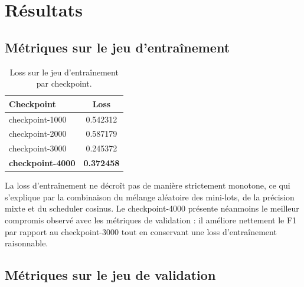 ﻿\documentclass[12pt, a4paper]{report}
\begin{document}
\section{Résultats}

\subsection{Métriques sur le jeu d'entraînement}

\begin{table}[H]
\centering
\renewcommand{\arraystretch}{1.4}
\begin{tabular}{lc}
\toprule
\textbf{Checkpoint} & \textbf{Loss} \\
\midrule
checkpoint-1000 & 0.542312 \\
checkpoint-2000 & 0.587179 \\
checkpoint-3000 & 0.245372 \\
\textbf{checkpoint-4000} & \textbf{0.372458} \\
\bottomrule
\end{tabular}
\caption{Loss sur le jeu d'entraînement par checkpoint.}
\label{tab:train_results}
\end{table}

La loss d'entraînement ne décroît pas de manière strictement monotone, ce qui
s'explique par la combinaison du mélange aléatoire des mini-lots, de la précision
mixte et du scheduler cosinus. Le checkpoint-4000 présente néanmoins le meilleur
compromis observé avec les métriques de validation : il améliore nettement le F1
par rapport au checkpoint-3000 tout en conservant une loss d'entraînement
raisonnable.

\subsection{Métriques sur le jeu de validation}

\begin{table}[H]
\centering
{}
\caption{Métriques de validation par checkpoint (jeu de 40\,000 exemples).
Le checkpoint-4000 est le modèle retenu.}
\label{tab:val_results}
\end{table}
\end{document}
